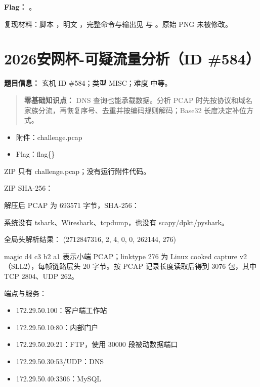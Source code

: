 \textbf{Flag：} \texttt{}。

复现材料：脚本 \texttt{}，明文 \texttt{}，完整命令与输出见 \texttt{} 与 \texttt{}。原始 PNG 未被修改。

\section{2026安网杯-可疑流量分析（ID \#584）}\label{ux5b89ux7f51ux676f-ux53efux7591ux6d41ux91cfux5206ux6790id-584}

\textbf{题目信息：} 玄机 ID \#584；类型 MISC；难度 中等。

\begin{quote}
\textbf{零基础知识点：} DNS 查询也能承载数据。分析 PCAP 时先按协议和域名家族分流，再恢复序号、去重并按编码规则解码；Base32 长度决定补位方式。
\end{quote}

\begin{itemize}
\item
  附件：challenge.pcap
\item
  Flag：flag\{\}
\end{itemize}

ZIP 只有 challenge.pcap；没有运行附件代码。

ZIP SHA-256： 

解压后 PCAP 为 693571 字节，SHA-256： 

系统没有 tshark、Wireshark、tcpdump，也没有 scapy/dpkt/pyshark。

全局头解析结果： (2712847316, 2, 4, 0, 0, 262144, 276)

magic d4 c3 b2 a1 表示小端 PCAP；linktype 276 为 Linux cooked capture v2（SLL2），每帧链路层头 20 字节。按 PCAP 记录长度读取后得到 3076 包，其中 TCP 2804、UDP 262。

端点与服务：

\begin{itemize}
\tightlist
\item
  172.29.50.100：客户端工作站
\item
  172.29.50.10:80：内部门户
\item
  172.29.50.20:21：FTP，使用 30000 段被动数据端口
\item
  172.29.50.30:53/UDP：DNS
\item
  172.29.50.40:3306：MySQL
\end{itemize}


